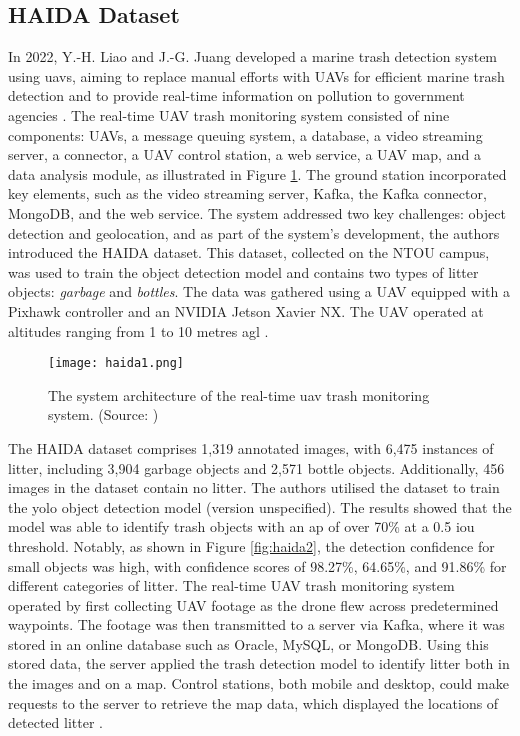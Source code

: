 \subsection{HAIDA Dataset}
\label{subsec:3_haida}

In 2022, Y.-H. Liao and J.-G. Juang developed a marine trash detection system using \gls{uav}s, aiming to replace manual efforts with UAVs for efficient marine trash detection and to provide real-time information on pollution to government agencies \cite{haida}. The real-time UAV trash monitoring system consisted of nine components: UAVs, a message queuing system, a database, a video streaming server, a connector, a UAV control station, a web service, a UAV map, and a data analysis module, as illustrated in Figure \ref{fig:haida1}. The ground station incorporated key elements, such as the video streaming server, Kafka, the Kafka connector, MongoDB, and the web service. The system addressed two key challenges: object detection and geolocation, and as part of the system's development, the authors introduced the HAIDA dataset. This dataset, collected on the NTOU campus, was used to train the object detection model and contains two types of litter objects: \textit{garbage} and \textit{bottles}. The data was gathered using a UAV equipped with a Pixhawk controller and an NVIDIA Jetson Xavier NX. The UAV operated at altitudes ranging from 1 to 10 metres \gls{agl} \cite{haida}.

\begin{figure}[!htbp]
    \centering
    \texttt{[image: haida1.png]}
    \caption{The system architecture of the real-time \gls{uav} trash monitoring system. (Source: \cite{haida})}
    \label{fig:haida1}
\end{figure}

The HAIDA dataset comprises 1,319 annotated images, with 6,475 instances of litter, including 3,904 garbage objects and 2,571 bottle objects. Additionally, 456 images in the dataset contain no litter. The authors utilised the dataset to train the \gls{yolo} object detection model (version unspecified). The results showed that the model was able to identify trash objects with an \gls{ap} of over 70\% at a 0.5 \gls{iou} threshold. Notably, as shown in Figure \ref{fig:haida2}, the detection confidence for small objects was high, with confidence scores of 98.27\%, 64.65\%, and 91.86\% for different categories of litter.
The real-time UAV trash monitoring system operated by first collecting UAV footage as the drone flew across predetermined waypoints. The footage was then transmitted to a server via Kafka, where it was stored in an online database such as Oracle, MySQL, or MongoDB. Using this stored data, the server applied the trash detection model to identify litter both in the images and on a map. Control stations, both mobile and desktop, could make requests to the server to retrieve the map data, which displayed the locations of detected litter \cite{haida}.

